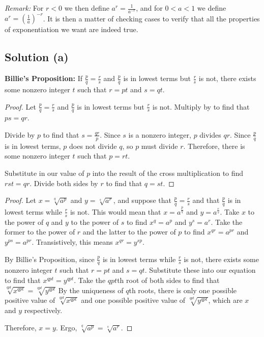 \documentclass[11pt]{article}
\begin{document}
    \textit{Remark:} For $r < 0$ we then define $a^r = \frac{1}{a^{-r}}$, and for $0 < a < 1$ we define $a^r = \left(\frac{1}{a}\right)^{-r}$. It is then a matter of checking cases to verify that all the properties of exponentiation we want are indeed true.
    \pagebreak
    \subsection{Solution (a)}
        \textbf{Billie's Proposition:}
            If $\frac{p}{q} = \frac{r}{s}$ and $\frac{p}{q}$ is in lowest terms but $\frac{r}{s}$ is not, there exists some nonzero integer $t$ such that $r = pt$ and $s = qt$.
        \begin{proof}
            Let $\frac{p}{q} = \frac{r}{s}$ and $\frac{p}{q}$ is in lowest terms but $\frac{r}{s}$ is not.
            Multiply by to find that $ps = qr$.
            
            Divide by $p$ to find that $s = \frac{qr}{p}$.
            Since $s$ is a nonzero integer, $p$ divides $qr$.
            Since $\frac{p}{q}$ is in lowest terms, $p$ does not divide $q$, so $p$ must divide $r$.
            Therefore, there is some nonzero integer $t$ such that $p = rt$.

            Substitute in our value of $p$ into the result of the cross multiplication to find $rst = qr$.
            Divide both sides by $r$ to find that $q = st$.
        \end{proof}
        \begin{proof}
            Let $x = \sqrt[q]{a^p}$ and $y = \sqrt[s]{a^r}$, and suppose that $\frac{p}{q} = \frac{r}{s}$ and that $\frac{p}{q}$ is in lowest terms while $\frac{r}{s}$ is not.
            This would mean that $x = a^\frac{p}{q}$ and $y = a^\frac{r}{s}$.
            Take $x$ to the power of $q$ and $y$ to the power of $s$ to find $x^q = a^p$ and $y^s = a^r$.
            Take the former to the power of $r$ and the latter to the power of $p$ to find $x^{qr} = a^{pr}$ and $y^{ps} = a^{pr}$.
            Transistively, this means $x^{qr} = y^{sp}$.
            
            By Billie's Proposition, since $\frac{p}{q}$ is in lowest terms while $\frac{r}{s}$ is not, there exists some nonzero integer $t$ such that $r = pt$ and $s = qt$.
            Substitute these into our equation to find that $x^{qpt} = y^{qpt}$.
            Take the $qpt$th root of both sides to find that $\sqrt[qpt]{x^{qpt}} = \sqrt[qpt]{y^{qpt}}$
            By the uniqueness of $q$th roots, there is only one possible positive value of $\sqrt[qpt]{x^{qpt}}$ and one possible positive value of $\sqrt[qpt]{y^{qpt}}$, which are $x$ and $y$ respectively.
            
            Therefore, $x = y$.
            Ergo, $\sqrt[q]{a^p} = \sqrt[s]{a^r}$.
        \end{proof}
\end{document}
